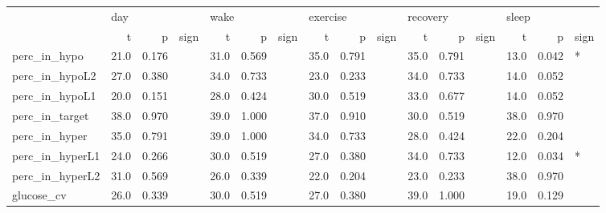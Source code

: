 \begin{tabular}{lrrlrrlrrlrrlrrl}
\toprule
{} & \multicolumn{3}{l}{day} & \multicolumn{3}{l}{wake} & \multicolumn{3}{l}{exercise} & \multicolumn{3}{l}{recovery} & \multicolumn{3}{l}{sleep} \\
{} &     t &      p & sign &     t &      p & sign &        t &      p & sign &        t &      p & sign &     t &      p & sign \\
\midrule
perc_in_hypo    &  21.0 &  0.176 &      &  31.0 &  0.569 &      &     35.0 &  0.791 &      &     35.0 &  0.791 &      &  13.0 &  0.042 &    * \\
perc_in_hypoL2  &  27.0 &  0.380 &      &  34.0 &  0.733 &      &     23.0 &  0.233 &      &     34.0 &  0.733 &      &  14.0 &  0.052 &      \\
perc_in_hypoL1  &  20.0 &  0.151 &      &  28.0 &  0.424 &      &     30.0 &  0.519 &      &     33.0 &  0.677 &      &  14.0 &  0.052 &      \\
perc_in_target  &  38.0 &  0.970 &      &  39.0 &  1.000 &      &     37.0 &  0.910 &      &     30.0 &  0.519 &      &  38.0 &  0.970 &      \\
perc_in_hyper   &  35.0 &  0.791 &      &  39.0 &  1.000 &      &     34.0 &  0.733 &      &     28.0 &  0.424 &      &  22.0 &  0.204 &      \\
perc_in_hyperL1 &  24.0 &  0.266 &      &  30.0 &  0.519 &      &     27.0 &  0.380 &      &     34.0 &  0.733 &      &  12.0 &  0.034 &    * \\
perc_in_hyperL2 &  31.0 &  0.569 &      &  26.0 &  0.339 &      &     22.0 &  0.204 &      &     23.0 &  0.233 &      &  38.0 &  0.970 &      \\
glucose_cv      &  26.0 &  0.339 &      &  30.0 &  0.519 &      &     27.0 &  0.380 &      &     39.0 &  1.000 &      &  19.0 &  0.129 &      \\
\bottomrule
\end{tabular}
